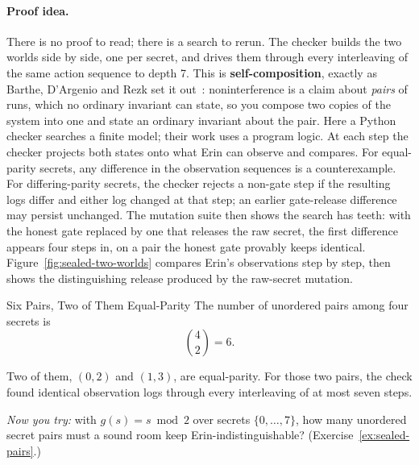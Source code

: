 \documentclass[11pt,a4paper]{article}
\theoremstyle{definition}
\begin{document}
\paragraph{Proof idea.} %
There is no proof to read; there is a search to rerun. The checker builds the
two worlds side by side, one per secret, and drives them through every
interleaving of the same action sequence to depth 7. This is
\textbf{self-composition}, exactly as Barthe, D'Argenio and Rezk set it
out~: noninterference is a claim about \emph{pairs} of runs,
which no ordinary invariant can state, so you compose two copies of the system
into one and state an ordinary invariant about the pair. Here a Python checker
searches a finite model; their work uses a program logic.
At each step the checker projects both states onto what Erin can observe and
compares. For equal-parity secrets, any difference in the observation sequences
is a counterexample. For differing-parity secrets, the checker rejects a
non-gate step if the resulting logs differ and either log changed at that step;
an earlier gate-release difference may persist unchanged. The mutation suite
then shows the search has teeth: with the honest gate replaced by one that
releases the raw secret, the first difference appears four steps in, on a pair
the honest gate provably keeps identical. Figure~\ref{fig:sealed-two-worlds}
compares Erin's observations step by step, then shows the distinguishing
release produced by the raw-secret mutation.



\begin{pdexample}{Six Pairs, Two of Them Equal-Parity}
\setlength{\parskip}{4pt plus 1pt}
The number of unordered pairs among four secrets is
\[
\binom{4}{2}=6.
\]

Two of them, $(0,2)$ and $(1,3)$, are equal-parity. For those two pairs, the check found identical
observation logs through every interleaving of at most seven steps.

\emph{Now you try:}
with $g(s)=s\bmod 2$ over secrets $\{0,\dots,7\}$, how many unordered secret
pairs must a sound room keep Erin-indistinguishable?
(Exercise~\ref{ex:sealed-pairs}.)
\end{pdexample}
\end{document}

